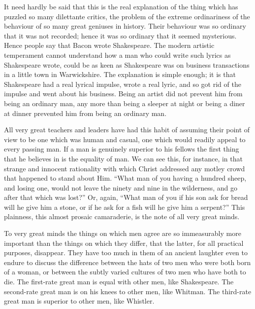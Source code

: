 It need hardly be said that this is the real explanation of the thing which has puzzled so many dilettante critics, the problem of the extreme ordinariness of the behaviour of so many great geniuses in history. Their behaviour was so ordinary that it was not recorded; hence it was so ordinary that it seemed mysterious. Hence people say that Bacon wrote Shakespeare. The modern artistic temperament cannot understand how a man who could write such lyrics as Shakespeare wrote, could be as keen as Shakespeare was on business transactions in a little town in Warwickshire. The explanation is simple enough; it is that Shakespeare had a real lyrical impulse, wrote a real lyric, and so got rid of the impulse and went about his business. Being an artist did not prevent him from being an ordinary man, any more than being a sleeper at night or being a diner at dinner prevented him from being an ordinary man.

All very great teachers and leaders have had this habit of assuming their point of view to be one which was human and casual, one which would readily appeal to every passing man. If a man is genuinely superior to his fellows the first thing that he believes in is the equality of man. We can see this, for instance, in that strange and innocent rationality with which Christ addressed any motley crowd that happened to stand about Him. “What man of you having a hundred sheep, and losing one, would not leave the ninety and nine in the wilderness, and go after that which was lost?” Or, again, “What man of you if his son ask for bread will he give him a stone, or if he ask for a fish will he give him a serpent?” This plainness, this almost prosaic camaraderie, is the note of all very great minds.

To very great minds the things on which men agree are so immeasurably more important than the things on which they differ, that the latter, for all practical purposes, disappear. They have too much in them of an ancient laughter even to endure to discuss the difference between the hats of two men who were both born of a woman, or between the subtly varied cultures of two men who have both to die. The first-rate great man is equal with other men, like Shakespeare. The second-rate great man is on his knees to other men, like Whitman. The third-rate great man is superior to other men, like Whistler.



